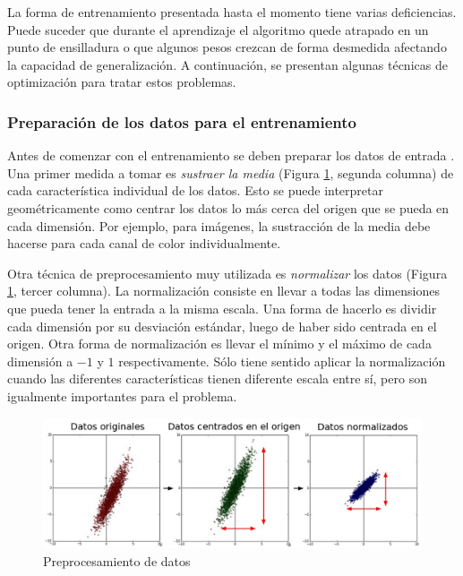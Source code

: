 \documentclass[spanish]{report}
\begin{document}
La forma de entrenamiento presentada hasta el momento tiene varias deficiencias. Puede suceder que durante el aprendizaje el algoritmo quede atrapado en un punto de ensilladura o que algunos pesos crezcan de forma desmedida afectando la capacidad de generalización. A continuación, se presentan algunas técnicas de optimización para tratar estos problemas.

\subsubsection{Preparación de los datos para el entrenamiento}

Antes de comenzar con el entrenamiento se deben preparar los datos de entrada \cite{curso_stanford}. Una primer medida a tomar es \textit{sustraer la media} (Figura \ref{fig:prepocesamiento_datos}, segunda columna) de cada característica individual de los datos. Esto se puede interpretar geométricamente como centrar los datos lo más cerca del origen que se pueda en cada dimensión. Por ejemplo, para imágenes, la sustracción de la media debe hacerse para cada canal de color individualmente.

Otra técnica de preprocesamiento muy utilizada es \textit{normalizar} los datos (Figura \ref{fig:prepocesamiento_datos}, tercer columna). La normalización consiste en llevar a todas las dimensiones que pueda tener la entrada a la misma escala. Una forma de hacerlo es dividir cada dimensión por su desviación estándar, luego de haber sido centrada en el origen. Otra forma de normalización es llevar el mínimo y el máximo de cada dimensión a $-1$ y $1$ respectivamente. Sólo tiene sentido aplicar la normalización cuando las diferentes características tienen diferente escala entre sí, pero son igualmente importantes para el problema.

\begin{figure}[H]
\centering
 \includegraphics[width=\linewidth]{prepro1.jpeg}
  \caption[Preprocesamiento de datos]{Preprocesamiento de datos \protect\footnotemark}
  \label{fig:prepocesamiento_datos}
\end{figure}
\end{document}

